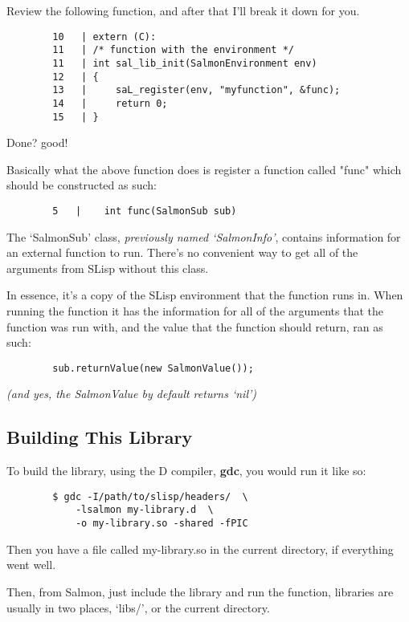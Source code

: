 \documentclass{article}
\begin{document}
	Review the following function, and after that I'll break it down for you.
	
	\begin{lstlisting}
		10   | extern (C):
		11   | /* function with the environment */
		11   | int sal_lib_init(SalmonEnvironment env)
		12   | {
		13   |     saL_register(env, "myfunction", &func);
		14   |     return 0;
		15   | }
	\end{lstlisting}

	Done? good!
	
	Basically what the above function does is register a function called "func" which should be constructed as such:
	
	\begin{lstlisting}
		5   |    int func(SalmonSub sub)
	\end{lstlisting}

	The `SalmonSub' class, \emph{previously named `SalmonInfo'}, contains information for an external function to run. There's no convenient way to get all of the arguments from SLisp without this class.
	
	In essence, it's a copy of the SLisp environment that the function runs in. When running the function it has the information for all of the arguments that the function was run with, and the value that the function should return, ran as such:
	
	\begin{lstlisting}
		sub.returnValue(new SalmonValue());
	\end{lstlisting}
	
	\emph{(and yes, the SalmonValue by default returns `nil')}
	
	\subsection{Building This Library}
	
	To build the library, using the D compiler, \textbf{gdc}, you would run it like so:
	
	\begin{lstlisting}
		$ gdc -I/path/to/slisp/headers/  \
			-lsalmon my-library.d  \
			-o my-library.so -shared -fPIC
	\end{lstlisting}

	Then you have a file called my-library.so in the current directory, if everything went well.
	
	Then, from Salmon, just include the library and run the function, libraries are usually in two places, `libs/', or the current directory.
	
\end{document}
